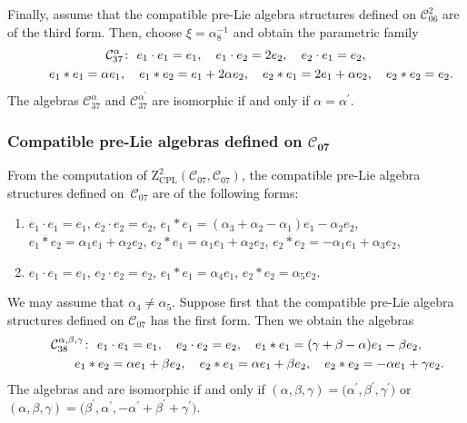 \documentclass[10pt,a4paper]{amsart}
\numberwithin{equation}{section}
\begin{document}
Finally, assume that the compatible
pre-Lie algebra structures defined on $\mathcal{C}_{06}^{2}$ are of the third
form. Then, choose $\xi = {\alpha^{-1} _{8}}$ and obtain the parametric
family
\begin{gather*}
\mathcal{C}_{37}^{\alpha } \colon \
e_{1}\cdot e_{1}=e_{1}, \quad e_{1}\cdot e_{2}=2e_{2}, \quad e_{2}\cdot
e_{1}=e_{2}, \\
\hphantom{\mathcal{C}_{37}^{\alpha } \colon} \
e_{1}\ast e_{1}=\alpha e_{1}, \quad e_{1}\ast e_{2}=e_{1}+2\alpha e_{2}, \quad
e_{2}\ast e_{1}=2e_{1}+\alpha e_{2}, \quad e_{2}\ast e_{2}=e_{2}.
\end{gather*}
The algebras $\mathcal{C}_{37}^{\alpha }$ and $\mathcal{C}_{37}^{\alpha ^{\prime }}
$ are isomorphic if and only if $\alpha =\alpha ^{\prime }$.

\subsubsection[Compatible pre-Lie algebras defined on C\_\{07\}]{Compatible pre-Lie algebras defined on $\boldsymbol{\mathcal{C}_{07}}$}

From the computation of $\mathrm{Z}_{\mathrm{CPL}}^{2}(\mathcal{C}_{07},
\mathcal{C}_{07})$, the compatible pre-Lie algebra structures defined on~$\mathcal{C}_{07}$ are of the following forms:
\begin{enumerate}\itemsep=0pt
\item[(1)] $e_{1}\cdot e_{1}=e_{1}$, $e_{2}\cdot e_{2}=e_{2}$,
$e_{1}\ast e_{1}=( \alpha _{3}+\alpha _{2}-\alpha _{1})
e_{1}-\alpha _{2}e_{2}$, $e_{1}\ast e_{2}=\alpha _{1}e_{1}+\alpha
_{2}e_{2}$, $e_{2}\ast e_{1}=\alpha _{1}e_{1}+\alpha _{2}e_{2}$, $e_{2}\ast e_{2}=-\alpha _{1}e_{1}+\alpha _{3}e_{2}$,
\item[(2)] $e_{1}\cdot e_{1}=e_{1}$, $e_{2}\cdot e_{2}=e_{2}$,
$e_{1}\ast e_{1}=\alpha _{4}e_{1}$, $e_{2}\ast e_{2}=\alpha _{5}e_{2}$.
\end{enumerate}

We may assume that $\alpha _{4}\neq \alpha _{5}$.
Suppose first that the
compatible pre-Lie algebra structures defined on $\mathcal{C}_{07}$ has the
first form. Then we obtain the algebras
\begin{gather*}
\mathcal{C}_{38}^{\alpha ,\beta ,\gamma } \colon \
e_{1}\cdot e_{1}=e_{1},\quad e_{2}\cdot e_{2}=e_{2}, \quad
e_{1}\ast e_{1}=( \gamma +\beta -\alpha ) e_{1}-\beta e_{2},\\
\hphantom{\mathcal{C}_{38}^{\alpha ,\beta ,\gamma } \colon} \
e_{1}\ast e_{2}=\alpha e_{1}+\beta e_{2}, \quad
e_{2}\ast e_{1}=\alpha
e_{1}+\beta e_{2},\quad e_{2}\ast e_{2}=-\alpha e_{1}+\gamma e_{2}.
\end{gather*}
The algebras  and  are isomorphic
if and only if
$
(\alpha, \beta, \gamma)=\bigl(\alpha ^{\prime },\beta ^{\prime },
\gamma ^{\prime }\bigr)$ or $(\alpha, \beta, \gamma)=\bigl(\beta ^{\prime },\alpha ^{\prime
}, -\alpha ^{\prime }+\beta ^{\prime }+\gamma ^{\prime }\bigr)$.
\end{document}
